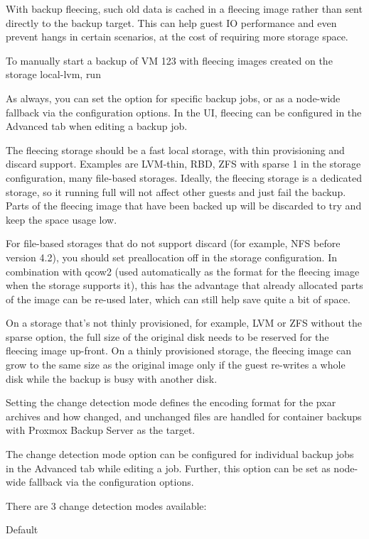 With backup fleecing, such old data is cached in a fleecing image rather than sent directly to the backup target. This can help guest IO performance and even prevent hangs in certain scenarios, at the cost of requiring more storage space.

To manually start a backup of VM 123 with fleecing images created on the storage local-lvm, run

As always, you can set the option for specific backup jobs, or as a node-wide fallback via the configuration options. In the UI, fleecing can be configured in the Advanced tab when editing a backup job.

The fleecing storage should be a fast local storage, with thin provisioning and discard support. Examples are LVM-thin, RBD, ZFS with sparse 1 in the storage configuration, many file-based storages. Ideally, the fleecing storage is a dedicated storage, so it running full will not affect other guests and just fail the backup. Parts of the fleecing image that have been backed up will be discarded to try and keep the space usage low.

For file-based storages that do not support discard (for example, NFS before version 4.2), you should set preallocation off in the storage configuration. In combination with qcow2 (used automatically as the format for the fleecing image when the storage supports it), this has the advantage that already allocated parts of the image can be re-used later, which can still help save quite a bit of space.

On a storage that’s not thinly provisioned, for example, LVM or ZFS without the sparse option, the full size of the original disk needs to be reserved for the fleecing image up-front. On a thinly provisioned storage, the fleecing image can grow to the same size as the original image only if the guest re-writes a whole disk while the backup is busy with another disk.

Setting the change detection mode defines the encoding format for the pxar archives and how changed, and unchanged files are handled for container backups with Proxmox Backup Server as the target.

The change detection mode option can be configured for individual backup jobs in the Advanced tab while editing a job. Further, this option can be set as node-wide fallback via the configuration options.

There are 3 change detection modes available:

Default

